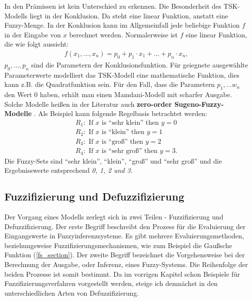 In den Prämissen ist kein Unterschied zu erkennen. Die Besonderheit des TSK-Modells liegt in der Konklusion. Da steht eine linear Funktion, anstatt eine Fuzzy-Menge. In der Konklusion kann im Allgemeinfall jede beliebige Funktion $f$ in der Eingabe von $x$ berechnet werden. Normalerweise ist $f$ eine linear Funktion, die wie folgt aussieht:
\begin{align}
	f(x_1, \ldots, x_n) = p_0 + p_1\cdot x_1 + \ldots + p_n\cdot x_n,
\end{align}
$p_0, \ldots, p_n$ sind die Parametern der Konklusionsfunktion. Für geiegnete ausgewählte Parameterwerte modelliert das TSK-Modell eine mathematische Funktion, dies kann z.B. die Quadratfunktion sein. Für den Fall, dass die Parametern $p_1, \ldots w_n$ den Wert 0 haben, erhält man einen Mamdani-Modell mit scharfer Ausgabe. Solche Modelle heißen in der Literatur auch \textbf{zero-order Sugeno-Fuzzy-Modelle} \cite{SCTemassi:01, NFMBothe:98, NFSC:97}.
Als Beispiel kann folgende Regelbasis betrachtet werden:
\begin{align}
R_1: \text{ If } x \text{ is ``sehr klein'' then } y = 0\\
R_2: \text{ If } x \text{ is ``klein'' then } y = 1\\
R_3: \text{ If } x \text{ is ``groß'' then } y = 2\\
R_4: \text{ If } x \text{ is ``sehr groß'' then } y = 3.
\end{align}
Die Fuzzy-Sets sind ``sehr klein'', ``klein'', ``groß'' und ``sehr groß'' und die Ergebnisswerte entsprechend \textit{0, 1, 2 und 3}.

\subsection{Fuzzifizierung und Defuzzifizierung}\label{FDF} 

Der Vorgang eines Modells zerlegt sich in zwei Teilen - Fuzzifizierung und Defuzzifizierung. Der erste Begriff beschreibt den Prozess für die Evaluierung der Eingangswerte in Fuzzyinferenzsysteme. Es gibt mehrere Evaluierungsmethoden, beziehungsweise Fuzzifizierungsmechanismen, wie zum Beispiel die Gaußsche Funktion (\ref{fs_section}). Der zweite Begriff bezeichnet die Vorgehensweise bei der Berechnung der Ausgabe, oder Inferenz, eines Fuzzy-Systems. Die Reihenfolge der beiden Prozesse ist somit bestimmt. Da im vorrigen Kapitel schon Beispiele für Fuzzifizierungsverfahren vorgestellt werden, steige ich demnächst in den unterschiedlichen Arten von Defuzzifizierung.

